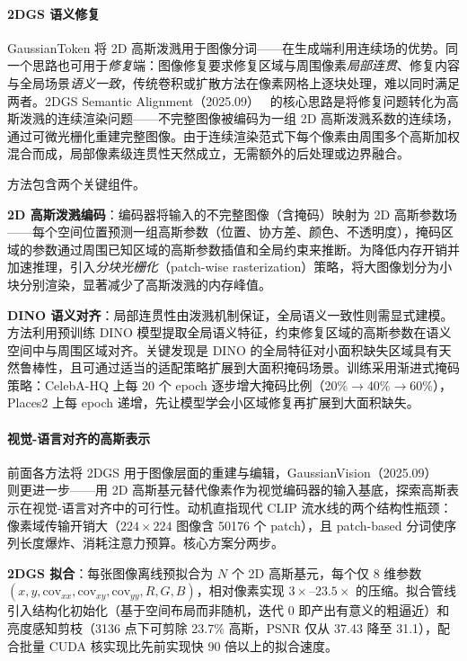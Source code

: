 \paragraph{2DGS 语义修复}

GaussianToken 将 2D 高斯泼溅用于图像分词——在生成端利用连续场的优势。同一个思路也可用于\emph{修复}端：图像修复要求修复区域与周围像素\emph{局部连贯}、修复内容与全局场景\emph{语义一致}，传统卷积或扩散方法在像素网格上逐块处理，难以同时满足两者。2DGS Semantic Alignment（2025.09）~\cite{2509_01964} 的核心思路是将修复问题转化为高斯泼溅的连续渲染问题——不完整图像被编码为一组 2D 高斯泼溅系数的连续场，通过可微光栅化重建完整图像。由于连续渲染范式下每个像素由周围多个高斯加权混合而成，局部像素级连贯性天然成立，无需额外的后处理或边界融合。

方法包含两个关键组件。

\textbf{2D 高斯泼溅编码}：编码器将输入的不完整图像（含掩码）映射为 2D 高斯参数场——每个空间位置预测一组高斯参数（位置、协方差、颜色、不透明度），掩码区域的参数通过周围已知区域的高斯参数插值和全局约束来推断。为降低内存开销并加速推理，引入\emph{分块光栅化}（patch-wise rasterization）策略，将大图像划分为小块分别渲染，显著减少了高斯泼溅的内存峰值。

\textbf{DINO 语义对齐}：局部连贯性由泼溅机制保证，全局语义一致性则需显式建模。方法利用预训练 DINO 模型提取全局语义特征，约束修复区域的高斯参数在语义空间中与周围区域对齐。关键发现是 DINO 的全局特征对小面积缺失区域具有天然鲁棒性，且可通过适当的适配策略扩展到大面积掩码场景。训练采用渐进式掩码策略：CelebA-HQ 上每 20 个 epoch 逐步增大掩码比例（20\%$\to$40\%$\to$60\%），Places2 上每 epoch 递增，先让模型学会小区域修复再扩展到大面积缺失。

\paragraph{视觉-语言对齐的高斯表示}

前面各方法将 2DGS 用于图像层面的重建与编辑，GaussianVision（2025.09）~\cite{2509_22615} 则更进一步——用 2D 高斯基元替代像素作为视觉编码器的输入基底，探索高斯表示在视觉-语言对齐中的可行性。动机直指现代 CLIP 流水线的两个结构性瓶颈：像素域传输开销大（$224 \times 224$ 图像含 50176 个 patch），且 patch-based 分词使序列长度爆炸、消耗注意力预算。核心方案分两步。

\textbf{2DGS 拟合}：每张图像离线预拟合为 $N$ 个 2D 高斯基元，每个仅 8 维参数 $(x, y, \text{cov}_{xx}, \text{cov}_{xy}, \text{cov}_{yy}, R, G, B)$，相对像素实现 $3\times$--$23.5\times$ 的压缩。拟合管线引入结构化初始化（基于空间布局而非随机，迭代 0 即产出有意义的粗逼近）和亮度感知剪枝（3136 点下可剪除 23.7\% 高斯，PSNR 仅从 37.43 降至 31.1），配合批量 CUDA 核实现比先前实现快 90 倍以上的拟合速度。

